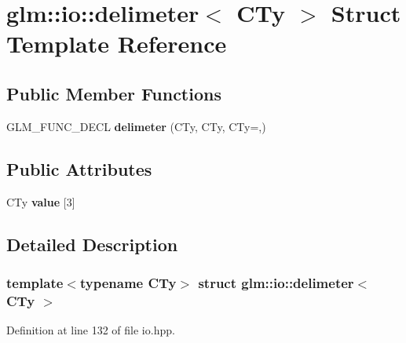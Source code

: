 \hypertarget{structglm_1_1io_1_1delimeter}{}\section{glm\+:\+:io\+:\+:delimeter$<$ C\+Ty $>$ Struct Template Reference}
\label{structglm_1_1io_1_1delimeter}
\subsection*{Public Member Functions}
\begin{DoxyCompactItemize}
\item 
\mbox{\label{structglm_1_1io_1_1delimeter_a5c1db62fae08a4c96eaf336781a4b53d}} 
G\+L\+M\+\_\+\+F\+U\+N\+C\+\_\+\+D\+E\+CL {\bfseries delimeter} (C\+Ty, C\+Ty, C\+Ty=\textquotesingle{},\textquotesingle{})
\end{DoxyCompactItemize}
\subsection*{Public Attributes}
\begin{DoxyCompactItemize}
\item 
\mbox{\label{structglm_1_1io_1_1delimeter_a9ade129dae50c4f716f724e7425f9c68}} 
C\+Ty {\bfseries value} \mbox{[}3\mbox{]}
\end{DoxyCompactItemize}


\subsection{Detailed Description}
\subsubsection*{template$<$typename C\+Ty$>$\newline
struct glm\+::io\+::delimeter$<$ C\+Ty $>$}



Definition at line 132 of file io.\+hpp.



